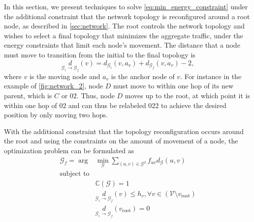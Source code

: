\documentclass[10pt,conference]{IEEEtran}
\begin{document}
In this section, we present techniques to solve
\eqref{eq:min_energy_constraint} under the additional constraint that
the network topology is reconfigured around a root node, as described
in \autoref{sec:network}.  The root controls the network topology and
wishes to select a final topology that minimizes the aggregate
traffic, under the energy constraints that limit each node's movement.
The distance that a node must move to transition from the initial to
the final topology is
\begin{equation}
\label{eq:distance_2} \underset{\mathcal{G}_{i} \rightarrow \mathcal{G}_{f}}{d}(v) = d_{\mathcal{G}_{i}}(v,a_{v}) +
d_{\mathcal{G}_{f}}(v,a_{v}) - 2,
\end{equation}
where $v$ is the moving node and $a_{v}$ is the anchor node of $v$.
For instance in the example of \autoref{fig:network_2}, node $D$ must move
to within one hop of its new parent, which is $C$ or $02$.  Thus, node
$D$ moves up to the root, at which point it is within one hop of $02$
and can thus be relabeled $022$ to achieve the desired position by only
moving two hops.

With the additional constraint that the topology reconfiguration occurs
around the root and using the constraints on the amount of movement of
a node, the optimization problem can be formulated as
\begin{align}
\label{eq:rooted_optimization} \mathcal{G}_f = \arg & \min_{\mathcal{G}}
\sum_{(u,v) \in \mathcal{G}^2} f_{uv} d_{\mathcal{G}}(u,v)\\
 \mbox{subject to} \nonumber\\
&\mathbb{C}(\mathcal{G})=1 \nonumber \\
& \underset{\mathcal{G}_{i} \rightarrow
\mathcal{G}_{f}}{d}(v) \leq h_{v}, \forall v \in (\mathcal{V}\setminus
v_{\text{root}}) \nonumber \\
& \underset{\mathcal{G}_{i} \rightarrow
  \mathcal{G}_{f}}{d}(v_{\text{root}}) = 0\nonumber
\end{align}
\end{document}
